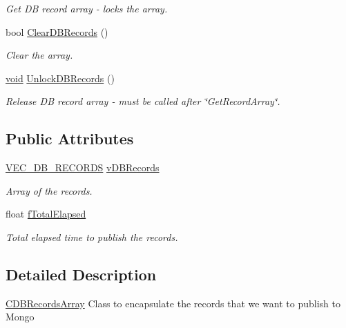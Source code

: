 \begin{DoxyCompactItemize}
\begin{DoxyCompactList}\small\item\em \-Get \-D\-B record array -\/ locks the array. \end{DoxyCompactList}\item 
bool \hyperlink{class_c_d_b_records_array_a421c6732b6d17ea3080ad19c3c250478}{\-Clear\-D\-B\-Records} ()
\begin{DoxyCompactList}\small\item\em \-Clear the array. \end{DoxyCompactList}\item 
\hyperlink{_cpclient_8h_a6464f7480a0fd0ee170cba12b2c0497f}{void} \hyperlink{class_c_d_b_records_array_aeb1530f115743efe2f2d231dcc555ced}{\-Unlock\-D\-B\-Records} ()
\begin{DoxyCompactList}\small\item\em \-Release \-D\-B record array -\/ must be called after \char`\"{}\-Get\-Record\-Array\char`\"{}. \end{DoxyCompactList}\end{DoxyCompactItemize}
\subsection*{\-Public \-Attributes}
\begin{DoxyCompactItemize}
\item 
\hyperlink{_c_d_b_records_array_8h_a32e3940d41c32d8e161b8775f6c4296a}{\-V\-E\-C\-\_\-\-D\-B\-\_\-\-R\-E\-C\-O\-R\-D\-S} \hyperlink{class_c_d_b_records_array_a5f29315f1b26188a7b53790b4d65dfda}{v\-D\-B\-Records}
\begin{DoxyCompactList}\small\item\em \-Array of the records. \end{DoxyCompactList}\item 
float \hyperlink{class_c_d_b_records_array_aa64819ed7441e3e28fc6cf13e42713d0}{f\-Total\-Elapsed}
\begin{DoxyCompactList}\small\item\em \-Total elapsed time to publish the records. \end{DoxyCompactList}\end{DoxyCompactItemize}


\subsection{\-Detailed \-Description}
\hyperlink{class_c_d_b_records_array}{\-C\-D\-B\-Records\-Array} \-Class to encapsulate the records that we want to publish to \-Mongo 

